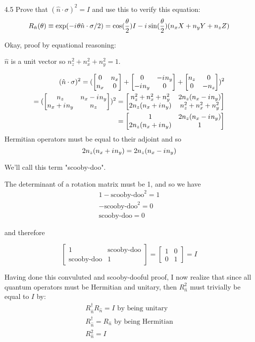 \documentclass[12pt, letterpaper, twoside]{article}
\newcommand{\iu}{{i\mkern1mu}}
\newcommand{\twoXtwo}[4]{\begin{bmatrix}
    #1 & #3 \\
    #2 & #4
\end{bmatrix}}
\begin{document}
4.5 Prove that $(\hat{n} \cdot \sigma)^2 = I$ and use this to verify this equation:
$$
	R_{\hat{n}}(\theta) \equiv \exp(-\iu \theta \hat{n} \cdot \sigma/2) = \cos(\frac{\theta}{2})I - \iu \sin(\frac{\theta}{2})(n_xX + n_yY + n_zZ)
$$

Okay, proof by equational reasoning:

$\hat{n}$ is a unit vector so $n_z^2 + n_x^2 + n_y^2 = 1$.

\begin{subequations}
	\begin{align}
		(\hat{n} \cdot \sigma)^2 = (\twoXtwo{0}{n_x}{n_x}{0} + \twoXtwo{0}{-\iu n_y}{-\iu n_y}{0} + \twoXtwo{n_z}{0}{0}{-n_z})^2 \\
		= (\twoXtwo{n_z}{n_x + \iu n_y}{n_x - \iu n_y}{n_z})^2
		= \twoXtwo{n_z^2 + n_x^2 + n_y^2}{2n_z(n_x + \iu n_y)}{2n_z(n_x - \iu n_y)}{n_z^2 + n_x^2 + n_y^2}                       \\
		= \twoXtwo{1}{2n_z(n_x + \iu n_y)}{2n_z(n_x - \iu n_y)}{1}
	\end{align}
\end{subequations}
Hermitian operators must be equal to their adjoint and so
$$
	2n_z(n_x + \iu n_y) = 2n_z(n_x - \iu n_y)
$$

We'll call this term "scooby-doo".

The determinant of a rotation matrix must be 1, and so we have
\begin{subequations}
	\begin{align}
	1 - \text{scooby-doo}^2 = 1 \\
	- \text{scooby-doo}^2 = 0 \\
	\text{scooby-doo} = 0
\end{align}
\end{subequations}

and therefore

$$
	\twoXtwo{1}{\text{scooby-doo}}{\text{scooby-doo}}{1} = \twoXtwo{1}{0}{0}{1} = I
$$

Having done this convuluted and scooby-dooful proof, I now realize that since all quantum operators must be Hermitian and unitary, then $R_{\hat{n}}^2$ must trivially be equal to $I$ by:
\begin{subequations}
	\begin{align}
R_{\hat{n}}^\dagger R_{\hat{n}} = I \text{ by being unitary} \\
R_{\hat{n}}^\dagger = R_{\hat{n}} \text{ by being Hermitian} \\
R_{\hat{n}}^2 = I
\end{align}
\end{subequations}
\end{document}
